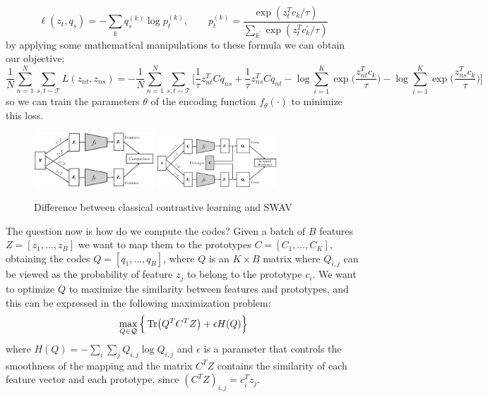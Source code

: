 \[\ell(z_t, q_s) = -\sum_k q_s^{(k)}\log p_t^{(k)}, \qquad p_t^{(k)} = \frac{\exp(z_t^Tc_k/\tau)}{\sum_{k^\prime}\exp(z_t^Tc_k^\prime/\tau)}\]
by applying some mathematical manipulations to these formula we can obtain our objective: 
\[\frac{1}{N}\sum_{n=1}^N \sum_{s, t \sim \mathcal{T}}L(z_{nt}, z_{ns}) = -\frac{1}{N}\sum_{n=1}^N \sum_{s, t \sim \mathcal{T}} \Bigg[ \frac{1}{\tau}z_{nt}^TCq_{ns} + \frac{1}{\tau}z_{ns}^TCq_{nt} - \log\sum_{i=1}^K\exp\Big(\frac{z_{nt}^Tc_k}{\tau}\Big) - \log\sum_{i=1}^K\exp\Big(\frac{z_{ns}^Tc_k}{\tau}\Big) \Bigg] \]
so we can train the parameters $\theta$ of the encoding function $f_\theta(\cdot)$ to minimize this loss.
\begin{figure}[H]
	\centering
	{\includegraphics[width=0.4\textwidth]{./images/swav_contrastive.png}}
	\qquad
	{\includegraphics[width=0.4\textwidth]{./images/swav_prediction.png}}
	\caption{Difference between classical contrastive learning and SWAV}
\end{figure}
\noindent The question now is how do we compute the codes? Given a batch of $B$ features $Z = [z_1, \dots, z_B]$ we want to map them to the prototypes $C= [C_1, \dots, C_K]$, obtaining the codes $Q = [q_1, \dots, q_B]$, where $Q$ is an $K\times B$ matrix where $Q_{i,j}$ can be viewed as the probability of feature $z_j$ to belong to the prototype $c_i$. We want to optimize $Q$ to maximize the similarity between features and prototypes, and this can be expressed in the following maximization problem:
\[ \max_{Q \in \mathcal{Q}} \Big\{ \Tr(Q^TC^TZ) + \epsilon H (Q) \Big\}\]
where $H(Q) = -\sum_i \sum_j Q_{i,j}\log Q_{i,j}$ and $\epsilon$ is a parameter that controls the smoothness of the mapping and the matrix $C^TZ$ contains the similarity of each feature vector and each prototype, since $(C^TZ)_{i,j} = c_i^Tz_j$.
